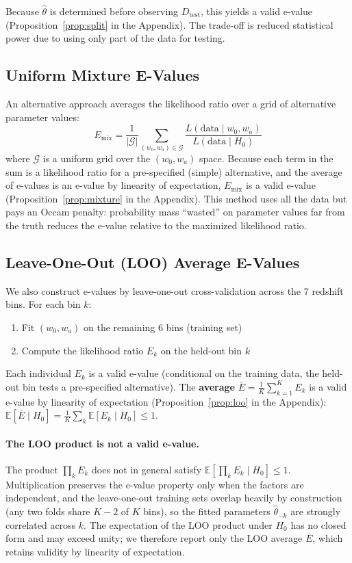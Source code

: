 \documentclass[11pt,a4paper]{article}
\newcommand{\E}{\mathbb{E}}
\begin{document}
Because $\hat{\theta}$ is determined before observing $D_{\text{test}}$, this yields a valid e-value (Proposition~\ref{prop:split} in the Appendix). The trade-off is reduced statistical power due to using only part of the data for testing.

\subsection{Uniform Mixture E-Values}

An alternative approach averages the likelihood ratio over a grid of alternative parameter values:
\begin{equation}
E_{\text{mix}} = \frac{1}{|\mathcal{G}|} \sum_{(w_0, w_a) \in \mathcal{G}} \frac{L(\text{data} \mid w_0, w_a)}{L(\text{data} \mid H_0)}
\end{equation}
where $\mathcal{G}$ is a uniform grid over the $(w_0, w_a)$ space. Because each term in the sum is a likelihood ratio for a pre-specified (simple) alternative, and the average of e-values is an e-value by linearity of expectation, $E_{\text{mix}}$ is a valid e-value (Proposition~\ref{prop:mixture} in the Appendix). This method uses all the data but pays an Occam penalty: probability mass ``wasted'' on parameter values far from the truth reduces the e-value relative to the maximized likelihood ratio.

\subsection{Leave-One-Out (LOO) Average E-Values}

We also construct e-values by leave-one-out cross-validation across the 7 redshift bins. For each bin $k$:
\begin{enumerate}
    \item Fit $(w_0, w_a)$ on the remaining 6 bins (training set)
    \item Compute the likelihood ratio $E_k$ on the held-out bin $k$
\end{enumerate}
Each individual $E_k$ is a valid e-value (conditional on the training data, the held-out bin tests a pre-specified alternative). The \textbf{average} $\bar{E} = \frac{1}{K}\sum_{k=1}^K E_k$ is a valid e-value by linearity of expectation (Proposition~\ref{prop:loo} in the Appendix): $\E[\bar{E} \mid H_0] = \frac{1}{K}\sum_k \E[E_k \mid H_0] \leq 1$.

\paragraph{The LOO product is not a valid e-value.} The product $\prod_k E_k$ does not in general satisfy $\E[\prod_k E_k \mid H_0] \leq 1$. Multiplication preserves the e-value property only when the factors are independent, and the leave-one-out training sets overlap heavily by construction (any two folds share $K-2$ of $K$ bins), so the fitted parameters $\hat{\theta}_{-k}$ are strongly correlated across $k$. The expectation of the LOO product under $H_0$ has no closed form and may exceed unity; we therefore report only the LOO average $\bar{E}$, which retains validity by linearity of expectation.
\end{document}
